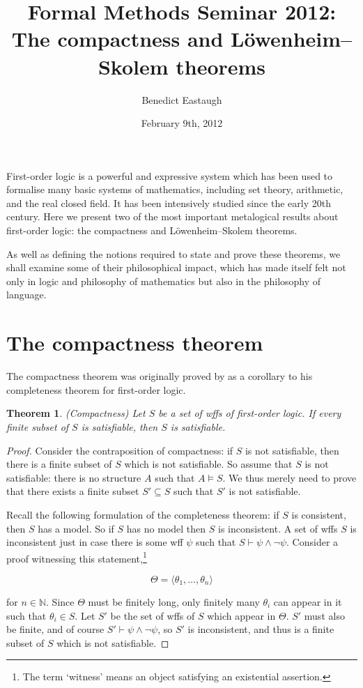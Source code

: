 \documentclass[10pt, a4paper, oneside]{article}
\title{Formal Methods Seminar 2012:\\
       The compactness and Löwenheim--Skolem theorems}
\author{Benedict Eastaugh}
\date{February 9th, 2012}
\newtheorem{thm}{Theorem}[section]
\theoremstyle{definition}
\theoremstyle{remark}
\theoremstyle{plain}
\theoremstyle{plain}
\begin{document}
\maketitle

First-order logic is a powerful and expressive system which has been used to
formalise many basic systems of mathematics, including set theory, arithmetic,
and the real closed field. It has been intensively studied since the early 20th
century. Here we present two of the most important metalogical results about
first-order logic: the compactness and Löwenheim--Skolem theorems.

As well as defining the notions required to state and prove these theorems, we
shall examine some of their philosophical impact, which has made itself felt not
only in logic and philosophy of mathematics but also in the philosophy of
language.


\section{The compactness theorem}

The compactness theorem was originally proved by \citet{godel1930} as a
corollary to his completeness theorem for first-order logic.

\begin{thm}
    (Compactness) Let $S$ be a set of wffs of first-order logic. If every finite
    subset of $S$ is satisfiable, then $S$ is satisfiable.
\end{thm}

\begin{proof}
    Consider the contraposition of compactness: if $S$ is not satisfiable, then
    there is a finite subset of $S$ which is not satisfiable. So assume that $S$
    is not satisfiable: there is no structure $A$ such that $A \models S$. We
    thus merely need to prove that there exists a finite subset $S' \subseteq S$
    such that $S'$ is not satisfiable.
    
    Recall the following formulation of the completeness theorem: if $S$ is
    consistent, then $S$ has a model. So if $S$ has no model then $S$ is
    inconsistent. A set of wffs $S$ is inconsistent just in case there is some
    wff $\psi$ such that $S \vdash \psi \wedge \neg\psi$. Consider a proof
    witnessing this statement,\footnote{The term `witness' means an object
    satisfying an existential assertion.}
    
    \begin{displaymath}
        \Theta = \langle \theta_1, \dotsc, \theta_n \rangle
    \end{displaymath}
    
    for $n \in \mathbb{N}$. Since $\Theta$ must be finitely long, only finitely
    many $\theta_i$ can appear in it such that $\theta_i \in S$. Let $S'$ be the
    set of wffs of $S$ which appear in $\Theta$. $S'$ must also be finite, and
    of course $S' \vdash \psi \wedge \neg\psi$, so $S'$ is inconsistent, and
    thus is a finite subset of $S$ which is not satisfiable.
\end{proof}
\end{document}
